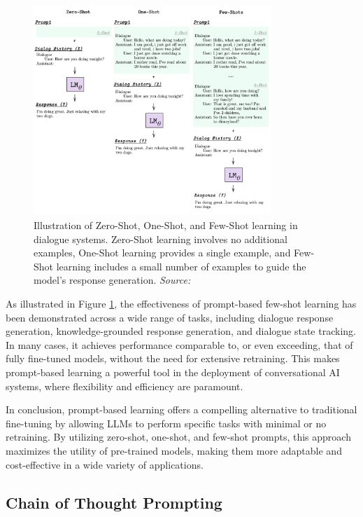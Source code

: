 \begin{figure}[h]
    \centering
    \includegraphics[width=0.8\textwidth]{images/llms/zero-one-few-shots.png}
    \caption{Illustration of Zero-Shot, One-Shot, and Few-Shot learning in dialogue systems. Zero-Shot learning involves no additional examples, One-Shot learning provides a single example, and Few-Shot learning includes a small number of examples to guide the model's response generation. \textit{Source:} \cite{madotto2021few}}
    \label{fig:zero_one_few_shot}
\end{figure}

As illustrated in Figure \ref{fig:zero_one_few_shot}, the effectiveness of prompt-based few-shot learning has been demonstrated across a wide range of tasks, including dialogue response generation, knowledge-grounded response generation, and dialogue state tracking. In many cases, it achieves performance comparable to, or even exceeding, that of fully fine-tuned models, without the need for extensive retraining. This makes prompt-based learning a powerful tool in the deployment of conversational AI systems, where flexibility and efficiency are paramount.

In conclusion, prompt-based learning offers a compelling alternative to traditional fine-tuning by allowing LLMs to perform specific tasks with minimal or no retraining. By utilizing zero-shot, one-shot, and few-shot prompts, this approach maximizes the utility of pre-trained models, making them more adaptable and cost-effective in a wide variety of applications.

\subsection{Chain of Thought Prompting}

